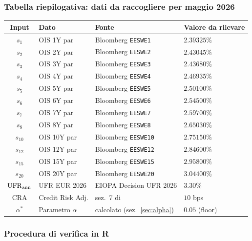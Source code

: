 \documentclass[11pt,a4paper]{article}
\theoremstyle{plain}
\theoremstyle{definition}
\theoremstyle{remark}
\newcommand{\UFR}{\ensuremath{\mathrm{UFR}}}
\newcommand{\CRA}{\ensuremath{\mathrm{CRA}}}
\begin{document}
\subsubsection*{Tabella riepilogativa: dati da raccogliere per maggio 2026}

\begin{center}\small
\renewcommand{\arraystretch}{1.3}
\begin{tabular}{clp{4cm}l}
\toprule
\textbf{Input} & \textbf{Dato} & \textbf{Fonte} & \textbf{Valore da rilevare} \\
\midrule
$s_1$  & OIS 1Y  par & Bloomberg \texttt{EESWE1}  & $2.39325$\% \\
$s_2$  & OIS 2Y  par & Bloomberg \texttt{EESWE2}  & $2.43045$\% \\
$s_3$  & OIS 3Y  par & Bloomberg \texttt{EESWE3}  & $2.43680$\% \\
$s_4$  & OIS 4Y  par & Bloomberg \texttt{EESWE4}  & $2.46935$\% \\
$s_5$  & OIS 5Y  par & Bloomberg \texttt{EESWE5}  & $2.50100$\% \\
$s_6$  & OIS 6Y  par & Bloomberg \texttt{EESWE6}  & $2.54500$\% \\
$s_7$  & OIS 7Y  par & Bloomberg \texttt{EESWE7}  & $2.59700$\% \\
$s_8$  & OIS 8Y  par & Bloomberg \texttt{EESWE8}  & $2.65030$\% \\
$s_{10}$ & OIS 10Y par & Bloomberg \texttt{EESWE10} & $2.75150$\% \\
$s_{12}$ & OIS 12Y par & Bloomberg \texttt{EESWE12} & $2.84600$\% \\
$s_{15}$ & OIS 15Y par & Bloomberg \texttt{EESWE15} & $2.95800$\% \\
$s_{20}$ & OIS 20Y par & Bloomberg \texttt{EESWE20} & $3.04400$\% \\
\midrule
$\UFR_{\rm ann}$ & UFR EUR 2026 & EIOPA Decision UFR 2026  & $3.30$\% \\
$\CRA$ & Credit Risk Adj. & sez.~7 di~\cite{eiopa2025} & $10$ bps \\
$\alpha^*$ & Parametro $\alpha$ & calcolato (sez.~\ref{sec:alpha}) & $0.05$ (floor) \\
\bottomrule
\end{tabular}
\end{center}

\subsubsection*{Procedura di verifica in R}
\end{document}
